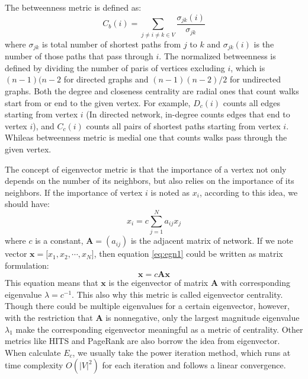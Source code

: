 \documentclass[symmetry,article,submit,moreauthors,pdftex,10pt,a4paper]{Definitions/mdpi}
\begin{document}
\begin{description}[leftmargin=0cm]
\item [(3) Betweenness centrality \boldmath$B_c$] The betweenness metric is defined as:
\begin{equation}
C_b(i)= \sum_{j \neq i \neq k \in V}\frac{\sigma_{jk}(i)}{\sigma_{jk}}
\end{equation}
where $\sigma_{jk}$ is total number of shortest paths from $j$ to $k$ and $\sigma_{jk}(i)$ is the number of those paths that pass through $i$. The normalized betweenness is defined by dividing the number of paris of vertices excluding $i$, which is $(n-1)(n-2$ for directed graphs and $(n-1)(n-2)/2$ for undirected graphs. Both the degree and closeness centrality are radial ones that count walks start from or end to the given vertex. For example, $D_c(i)$ counts all edges starting from vertex $i$ (In directed network, in-degree counts edges that end to vertex $i$), and $C_c(i)$ counts all pairs of shortest paths starting from vertex $i$. Whileas betweenness metric is medial one that counts walks pass through the given vertex.

\item [(4) Eigenvector centrality \boldmath$E_c$] The concept of eigenvector metric is that the importance of a vertex not only depends on the number of its neighbors, but also relies on the importance of its neighbors. If the importance of vertex $i$ is noted as $x_i$, according to this idea, we should have:
\begin{equation}
\label{eq:egn1}
x_i = c\sum_{j=1}^{N}{a_{ij}x_j}
\end{equation}
where $c$ is a constant, $\boldsymbol{A}=(a_{ij})$ is the adjacent matrix of network. If we note vector $\boldsymbol{x}=\lbrack x_1, x_2, \cdots, x_N\rbrack$, then equation \ref{eq:egn1} could be written as matrix formulation:
\begin{equation}
\boldsymbol{x} = c\boldsymbol{Ax}
\end{equation}
This equation means that $\boldsymbol{x}$ is the eigenvector of matrix $\boldsymbol{A}$ with corresponding eigenvalue $\lambda=c^{-1}$. This also why this metric is called eigenvector centrality. Though there could be multiple eigenvalues for a certain eigenvector, however, with the restriction that $\boldsymbol{A}$ is nonnegative, only the largest magnitude eigenvalue $\lambda_1$ make the corresponding eigenvector meaningful as a metric of centrality. Other metrics like HITS and PageRank are also borrow the idea from eigenvector. When calculate $E_c$, we usually take the power iteration method, which runs at time complexity $O(|V|^2)$ for each iteration and follows a linear convergence.
\end{description}
\end{document}
